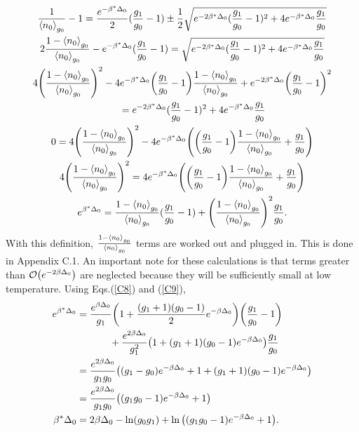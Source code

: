 \begin{gather}
    \frac{1}{\left<{n_0}\right>_{g_0}}-1=\frac{e^{-\beta^*\Delta_0}}{2}(\frac{g_1}{g_0}-1)\pm \frac{1}{2}\sqrt{e^{-2\beta^*\Delta_0} (\frac{g_1}{g_0}-1)^2+ 4e^{-\beta^*\Delta_0}\frac{g_1}{g_0}}\nonumber\\
    2\frac{1-\left<{n_0}\right>_{g_0}}{\left<{n_0}\right>_{g_0}}-e^{-\beta^*\Delta_0}(\frac{g_1}{g_0}-1)=\sqrt{e^{-2\beta^*\Delta_0} (\frac{g_1}{g_0}-1)^2+ 4e^{-\beta^*\Delta_0}\frac{g_1}{g_0}}\nonumber\\
    4\qty(\frac{1-\left<{n_0}\right>_{g_0}}{\left<{n_0}\right>_{g_0}})^2-4e^{-\beta^*\Delta_0}\qty(\frac{g_1}{g_0}-1) \frac{1-\left<{n_0}\right>_{g_0}}{\left<{n_0}\right>_{g_0}}+e^{-2\beta^*\Delta_0} \qty(\frac{g_1}{g_0}-1)^2\nonumber\\ 
    \ \ \ \ \ \ \  =e^{-2\beta^*\Delta_0} (\frac{g_1}{g_0}-1)^2+ 4e^{-\beta^*\Delta_0}\frac{g_1}{g_0} \nonumber\nonumber\\
    0=4\qty(\frac{1-\left<{n_0}\right>_{g_0}}{\left<{n_0}\right>_{g_0}})^2- 4e^{-\beta^*\Delta_0}\qty(\qty(\frac{g_1}{g_0}-1)\frac{1-\left<{n_0}\right>_{g_0}}{\left<{n_0}\right>_{g_0}}+\frac{g_1}{g_0})\nonumber\\
    4\qty(\frac{1-\left<{n_0}\right>_{g_0}}{\left<{n_0}\right>_{g_0}})^2=4e^{-\beta^*\Delta_0}\qty(\qty(\frac{g_1}{g_0}-1)\frac{1-\left<{n_0}\right>_{g_0}}{\left<{n_0}\right>_{g_0}}+\frac{g_1}{g_0})\nonumber\\
    e^{\beta^* \Delta_0}=\frac{1-\left<{n_0}\right>_{g_0}}{\left<{n_0}\right>_{g_0}}(\frac{g_1}{g_0}-1)+\qty(\frac{1-\left<{n_0}\right>_{g_0}}{\left<{n_0}\right>_{g_0}})^2\frac{g_1}{g_0}.
\end{gather}
With this definition, $\frac{1-\left<{n_0}\right>_{g_0}}{\left<{n_0}\right>_{g_0}}$ terms are worked out and plugged in. This is done in Appendix C.1. An important note for these calculations is that terms greater than $\mathcal{O}\qty(e^{-2\beta \Delta_0})$ are neglected because they will be sufficiently small at low temperature. Using Eqs.\@ (\ref{C8}) and (\ref{C9}),
\begin{align}
    e^{\beta^* \Delta_0}&=\frac{e^{\beta\Delta_0}}{g_1}\qty(1+\frac{(g_1+1)(g_0-1)}{2}e^{-\beta\Delta_0})\qty(\frac{g_1}{g_0}-1)\nonumber\\
    &\ \ \ \ \ \ \ \ \ \ +\frac{e^{2\beta\Delta_0}}{g_1^2}\qty(1+(g_1+1)(g_0-1)e^{-\beta\Delta_0})\frac{g_1}{g_0}\nonumber\\
    &=\frac{e^{2\beta\Delta_0}}{g_1g_0}\qty((g_1-g_0)e^{-\beta\Delta_0}+1+(g_1+1)(g_0-1)e^{-\beta\Delta_0})\nonumber\\
    &=\frac{e^{2\beta\Delta_0}}{g_1g_0}\qty((g_1g_0-1)e^{-\beta\Delta_0}+1)\\
    \beta^*\Delta_0&=2\beta\Delta_0-\ln(g_0g_1)+\ln\qty((g_1g_0-1)e^{-\beta\Delta_0}+1).
\end{align}
